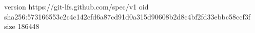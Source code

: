 version https://git-lfs.github.com/spec/v1
oid sha256:573166553c2c4c142cfd6a87cd91d0a315d90608b2d8c4bf2fd33ebbc58ccf3f
size 186448
